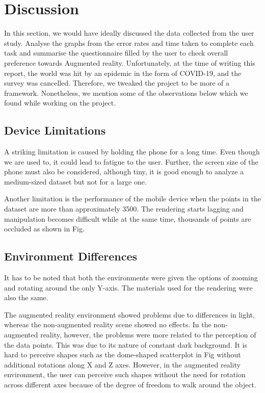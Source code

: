 \documentclass[journal]{vgtc}                %
\begin{document}
\section{Discussion}
In this section, we would have ideally discussed the data collected from the user study. Analyse the graphs from the error rates and time taken to complete each task and summarise the questionnaire filled by the user to check overall preference towards Augmented reality. Unfortunately, at the time of writing this report, the world was hit by an epidemic in the form of COVID-19\cite{Velavan2020}, and the survey was cancelled. Therefore, we tweaked the project to be more of a framework. Nonetheless, we mention some of the observations below which we found while working on the project. 

\subsection{Device Limitations}

A striking limitation is caused by holding the phone for a long time. Even though we are used to, it could lead to fatigue to the user. Further, the screen size of the phone must also be considered, although tiny, it is good enough to analyze a medium-sized dataset but not for a large one.

Another limitation is the performance of the mobile device when the points in the dataset are more than approximately 3500. The rendering starts lagging and manipulation becomes difficult while at the same time, thousands of points are occluded as shown in Fig.

\subsection{Environment Differences}
It has to be noted that both the environments were given the options of zooming and rotating around the only Y-axis. The materials used for the rendering were also the same.

The augmented reality environment showed problems due to differences in light, whereas the non-augmented reality scene showed no effects. In the non-augmented reality, however, the problems were more related to the perception of the data points. This was due to its nature of constant dark background. It is hard to perceive shapes such as the dome-shaped scatterplot in Fig without additional rotations along X and Z axes. However, in the augmented reality environment, the user can perceive such shapes without the need for rotation across different axes because of the degree of freedom to walk around the object.
\end{document}
